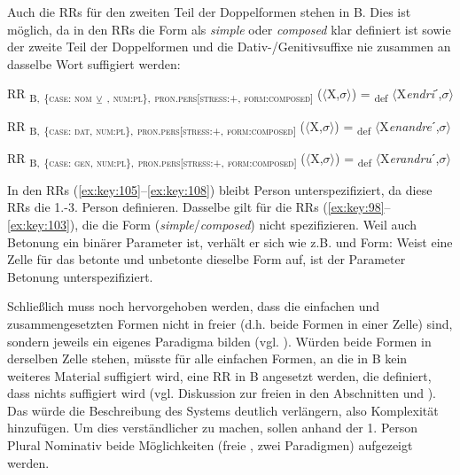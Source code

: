 Auch die RRs für den zweiten Teil der Doppelformen stehen in  B. Dies ist möglich, da in den RRs die Form als \textit{simple} oder \textit{composed} klar definiert ist sowie der zweite Teil der Doppelformen und die Dativ-/Genitivsuffixe nie zusammen an dasselbe Wort suffigiert werden:

\ea%
\label{ex:key:106}
 RR \textsubscript{B,} \textsubscript{\{\textsc{case:} \textsc{nom}} \textsubscript{\tiny $\veebar$}\textsubscript{ \AKK, \textsc{num:pl}\},} \textsubscript{\textsc{pron.pers[stress:+}, \textsc{form:composed]}} ($\langle$X,$\sigma$$\rangle$) = \textsubscript{def} $\langle$X\textit{endri}ˊ,$\sigma$$\rangle$
\z

\ea%
\label{ex:key:107}
 RR \textsubscript{B,} \textsubscript{\{\textsc{case: dat}, \textsc{num:pl}\},} \textsubscript{\textsc{pron.pers[stress:+}, \textsc{form:composed]}} ($\langle$X,$\sigma$$\rangle$) = \textsubscript{def} $\langle$X\textit{enandre}ˊ,$\sigma$$\rangle$
\z

\ea%
\label{ex:key:108}
 RR \textsubscript{B,} \textsubscript{\{\textsc{case: gen}, \textsc{num:pl}\},} \textsubscript{\textsc{pron.pers[stress:+}, \textsc{form:composed]}} ($\langle$X,$\sigma$$\rangle$) = \textsubscript{def} $\langle$X\textit{erandru}ˊ,$\sigma$$\rangle$
\z

In den RRs (\ref{ex:key:105}--\ref{ex:key:108}) bleibt Person unterspezifiziert, da diese RRs die 1.-3. Person definieren. Dasselbe gilt für die RRs (\ref{ex:key:98}--\ref{ex:key:103}), die die Form (\textit{simple}/\textit{composed}) nicht spezifizieren. Weil auch Betonung ein binärer Parameter ist, verhält er sich wie z.B.  und Form: Weist eine Zelle für das betonte und unbetonte  dieselbe Form auf, ist der Parameter Betonung unterspezifiziert.

Schließlich muss noch hervorgehoben werden, dass die einfachen und zusammengesetzten Formen nicht in freier  (d.h. beide Formen in einer Zelle) sind, sondern jeweils ein eigenes Paradigma bilden (vgl. ). Würden beide Formen in derselben Zelle stehen, müsste für alle einfachen Formen, an die in  B kein weiteres Material suffigiert wird, eine RR in  B angesetzt werden, die definiert, dass nichts suffigiert wird (vgl. Diskussion zur freien  in den Abschnitten  und ). Das würde die Beschreibung des Systems deutlich verlängern, also Komplexität hinzufügen. Um dies verständlicher zu machen, sollen anhand der 1. Person Plural Nominativ beide Möglichkeiten (freie , zwei Paradigmen) aufgezeigt werden.

